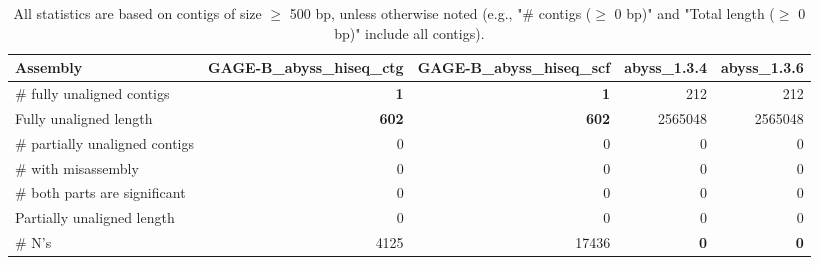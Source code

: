 \documentclass[12pt,a4paper]{article}
\begin{document}
\begin{table}[ht]
\begin{center}
\caption{All statistics are based on contigs of size $\geq$ 500 bp, unless otherwise noted (e.g., "\# contigs ($\geq$ 0 bp)" and "Total length ($\geq$ 0 bp)" include all contigs).}
\begin{tabular}{|l*{4}{|r}|}
\hline
Assembly & GAGE-B\_abyss\_hiseq\_ctg & GAGE-B\_abyss\_hiseq\_scf & abyss\_1.3.4 & abyss\_1.3.6 \\ \hline
\# fully unaligned contigs & {\bf 1} & {\bf 1} & 212 & 212 \\ \hline
Fully unaligned length & {\bf 602} & {\bf 602} & 2565048 & 2565048 \\ \hline
\# partially unaligned contigs & 0 & 0 & 0 & 0 \\ \hline
\hspace{5mm}\# with misassembly & 0 & 0 & 0 & 0 \\ \hline
\hspace{5mm}\# both parts are significant & 0 & 0 & 0 & 0 \\ \hline
Partially unaligned length & 0 & 0 & 0 & 0 \\ \hline
\# N's & 4125 & 17436 & {\bf 0} & {\bf 0} \\ \hline
\end{tabular}
\end{center}
\end{table}
\end{document}

